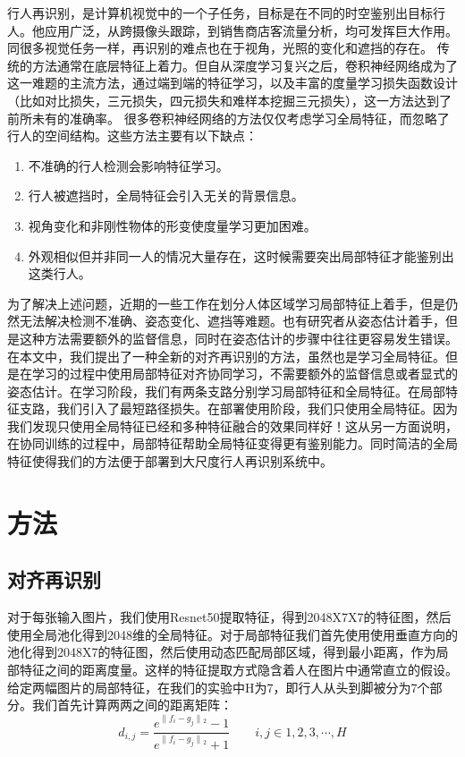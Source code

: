 行人再识别，是计算机视觉中的一个子任务，目标是在不同的时空鉴别出目标行人。他应用广泛，从跨摄像头跟踪，到销售商店客流量分析，均可发挥巨大作用。同很多视觉任务一样，再识别的难点也在于视角，光照的变化和遮挡的存在。
传统的方法通常在底层特征上着力。但自从深度学习复兴之后，卷积神经网络成为了这一难题的主流方法，通过端到端的特征学习，以及丰富的度量学习损失函数设计（比如对比损失，三元损失，四元损失和难样本挖掘三元损失），这一方法达到了前所未有的准确率。
很多卷积神经网络的方法仅仅考虑学习全局特征，而忽略了行人的空间结构。这些方法主要有以下缺点：
\begin{enumerate}
	\item 不准确的行人检测会影响特征学习。
	\item 行人被遮挡时，全局特征会引入无关的背景信息。
	\item 视角变化和非刚性物体的形变使度量学习更加困难。
	\item 外观相似但并非同一人的情况大量存在，这时候需要突出局部特征才能鉴别出这类行人。
\end{enumerate}
为了解决上述问题，近期的一些工作在划分人体区域学习局部特征上着手，但是仍然无法解决检测不准确、姿态变化、遮挡等难题。也有研究者从姿态估计着手，但是这种方法需要额外的监督信息，同时在姿态估计的步骤中往往更容易发生错误。
在本文中，我们提出了一种全新的对齐再识别的方法，虽然也是学习全局特征。但是在学习的过程中使用局部特征对齐协同学习，不需要额外的监督信息或者显式的姿态估计。在学习阶段，我们有两条支路分别学习局部特征和全局特征。在局部特征支路，我们引入了最短路径损失。在部署使用阶段，我们只使用全局特征。因为我们发现只使用全局特征已经和多种特征融合的效果同样好！这从另一方面说明，在协同训练的过程中，局部特征帮助全局特征变得更有鉴别能力。同时简洁的全局特征使得我们的方法便于部署到大尺度行人再识别系统中。

\section{方法}

\subsection{对齐再识别}

对于每张输入图片，我们使用Resnet50提取特征，得到2048X7X7的特征图，然后使用全局池化得到2048维的全局特征。对于局部特征我们首先使用使用垂直方向的池化得到2048X7的特征图，然后使用动态匹配局部区域，得到最小距离，作为局部特征之间的距离度量。这样的特征提取方式隐含着人在图片中通常直立的假设。
给定两幅图片的局部特征，在我们的实验中H为7，即行人从头到脚被分为7个部分。我们首先计算两两之间的距离矩阵：
\begin{equation} {d_{i,j}} = \frac{{{e^{\|{f_i} - {g_j}\|{_2}}} - 1}}{{{e^{\|{f_i} - {g_j}\|{_2}}} + 1}}\qquad i,j \in 1,2,3, \cdots ,H \end{equation}

